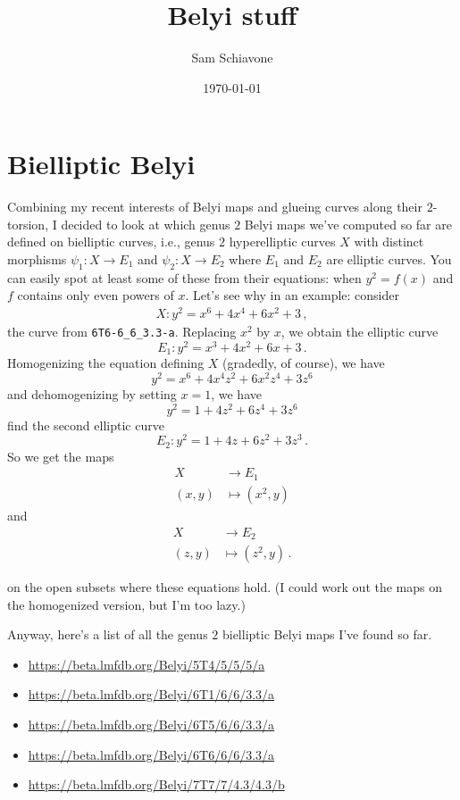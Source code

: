 \documentclass[reqno, 12pt]{amsart}
\theoremstyle{definition}
\theoremstyle{remark}
\begin{document}
\title{Belyi stuff}
\author{Sam Schiavone}
\date{\today}

\maketitle

\section{Bielliptic Belyi}

Combining my recent interests of Belyi maps and glueing curves along their $2$-torsion, I decided to look at which genus $2$ Belyi maps we've computed so far are defined on bielliptic curves, i.e., genus $2$ hyperelliptic curves $X$ with distinct morphisms $\psi_1: X \to E_1$ and $\psi_2: X \to E_2$ where $E_1$ and $E_2$ are elliptic curves. You can easily spot at least some of these from their equations: when $y^2 = f(x)$ and $f$ contains only even powers of $x$. Let's see why in an example: consider
\begin{align*}
X: y^{2} = x^{6} + 4 x^{4} + 6 x^{2} + 3 \, ,
\end{align*}
the curve from \texttt{6T6-6\_6\_3.3-a}. Replacing $x^2$ by $x$, we obtain the elliptic curve
$$
E_1: y^2 = x^3 + 4 x^2 + 6 x + 3 \, .
$$
Homogenizing the equation defining $X$ (gradedly, of course), we have
$$
y^{2} = x^{6} + 4 x^{4} z^2  + 6 x^{2} z^4 + 3 z^6
$$
and dehomogenizing by setting $x = 1$, we have
$$
y^{2} = 1 + 4 z^2  + 6 z^4 + 3 z^6
$$
find the second elliptic curve
$$
E_2: y^2 = 1 + 4 z + 6 z^2 + 3 z^3 \, .
$$
So we get the maps
\begin{align*}
X &\to E_1\\
(x,y) &\mapsto (x^2, y)
\end{align*}
and
\begin{align*}
X &\to E_2\\
(z,y) &\mapsto (z^2, y) \, .
\end{align*}

on the open subsets where these equations hold. (I could work out the maps on the homogenized version, but I'm too lazy.)

Anyway, here's a list of all the genus $2$ bielliptic Belyi maps I've found so far.
\begin{itemize}
\item
\url{https://beta.lmfdb.org/Belyi/5T4/5/5/5/a}

\item
\url{https://beta.lmfdb.org/Belyi/6T1/6/6/3.3/a}

\item
\url{https://beta.lmfdb.org/Belyi/6T5/6/6/3.3/a}

\item
\url{https://beta.lmfdb.org/Belyi/6T6/6/6/3.3/a}

\item
\url{https://beta.lmfdb.org/Belyi/7T7/7/4.3/4.3/b}
\end{itemize}
\end{document}
